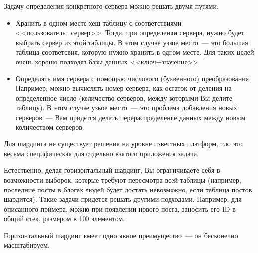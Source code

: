 Задачу определения конкретного сервера можно решать двумя путями:
\begin{itemize}
\item Хранить в одном месте хеш-таблицу с соответствиями <<пользователь=сервер>>. Тогда, при определении сервера, нужно будет 
выбрать сервер из этой таблицы. В этом случае узкое место~--- это большая таблица соответсвия, которую нужно хранить в одном месте. 
Для таких целей очень хорошо подходят базы данных <<ключ=значение>>
\item Определять имя сервера с помощью числового (буквенного) преобразования. Например, можно вычислять номер сервера, 
как остаток от деления на определенное число (количество серверов, между которыми Вы делите таблицу). В этом случае узкое место~--- 
это проблема добавления новых серверов~--- Вам придется делать перераспределение данных между новым количеством серверов.
\end{itemize}

Для шардинга не существует решения на уровне известных платформ, т.к. это весьма специфическая для отдельно взятого приложения задача.

Естественно, делая горизонтальный шардинг, Вы ограничиваете себя в возможности выборок, которые требуют 
пересмотра всей таблицы (например, последние посты в блогах людей будет достать невозможно, если таблица постов шардится). 
Такие задачи придется решать другими подходами. Например, для описанного примера, можно при появлении нового поста, заносить 
его ID в общий стек, размером в 100 элементом.

Горизонтальный шардинг имеет одно явное преимущество~--- он бесконечно масштабируем.